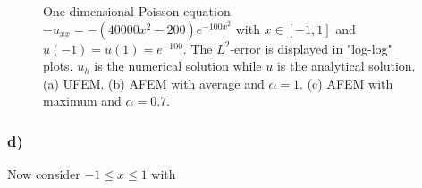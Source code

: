 \begin{figure}[!t]
  \centering
  \hfill
  \hfill
  \caption{One dimensional Poisson equation $-u_{xx} = -(40000x^2 - 200)e^{-100x^2}$ with $x \in [-1,1]$ and $u(-1) = u(1) = e^{-100}$. The $L^2$-error is displayed in "log-log" plots. $u_h$ is the numerical solution while $u$ is the analytical solution. (a) UFEM. (b) AFEM with average and $\alpha = 1$. (c) AFEM with maximum and $\alpha = 0.7$.}
  \label{fig:5c}
\end{figure}

\subsubsection{d)}

Now consider $-1 \le x \le 1$ with

